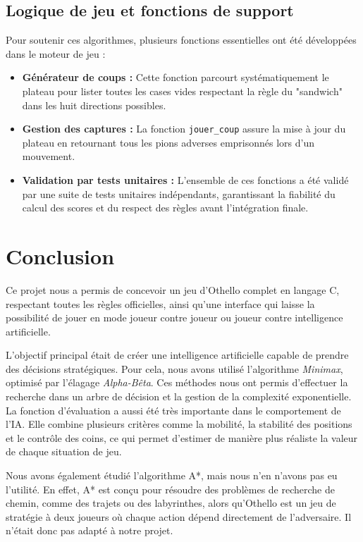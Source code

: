 \documentclass{article}
\begin{document}
\vspace{0.3cm}


\subsection{Logique de jeu et fonctions de support}

Pour soutenir ces algorithmes, plusieurs fonctions essentielles ont été développées dans le moteur de jeu :
\begin{itemize}
    \item \textbf{Générateur de coups :} Cette fonction parcourt systématiquement le plateau pour lister toutes les cases vides respectant la règle du "sandwich" dans les huit directions possibles.
    \item \textbf{Gestion des captures :} La fonction \texttt{jouer\_coup} assure la mise à jour du plateau en retournant tous les pions adverses emprisonnés lors d'un mouvement.
    \item \textbf{Validation par tests unitaires :} L'ensemble de ces fonctions a été validé par une suite de tests unitaires indépendants, garantissant la fiabilité du calcul des scores et du respect des règles avant l'intégration finale.
\end{itemize}

\section{\textbf{Conclusion}}

Ce projet nous a permis de concevoir un jeu d'Othello complet en langage C, respectant toutes les règles officielles, ainsi qu'une interface qui laisse la possibilité de jouer en mode joueur contre joueur ou joueur contre intelligence artificielle.

L'objectif principal était de créer une intelligence artificielle capable de prendre des décisions stratégiques. Pour cela, nous avons utilisé l'algorithme \emph{Minimax}, optimisé par l'élagage \emph{Alpha-Bêta}. Ces méthodes nous ont permis d'effectuer la recherche dans un arbre de décision et la gestion de la complexité exponentielle. La fonction d'évaluation a aussi été très importante dans le comportement de l'IA. Elle combine plusieurs critères comme la mobilité, la stabilité des positions et le contrôle des coins, ce qui permet d'estimer de manière plus réaliste la valeur de chaque situation de jeu.

Nous avons également étudié l'algorithme A*, mais nous n'en n'avons pas eu l'utilité. En effet, A* est conçu pour résoudre des problèmes de recherche de chemin, comme des trajets ou des labyrinthes, alors qu'Othello est un jeu de stratégie à deux joueurs où chaque action dépend directement de l'adversaire. Il n'était donc pas adapté à notre projet.
\end{document}
